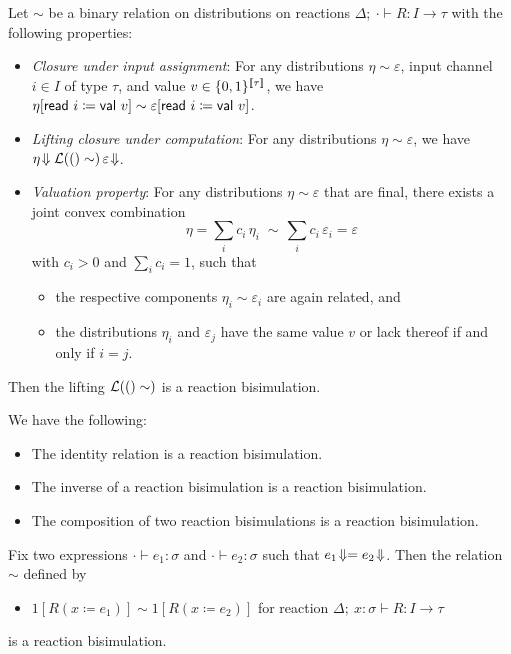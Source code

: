 \begin{lemma}\label{lem:reaction_seed}
Let $\sim$ be a binary relation on distributions on reactions $\Delta; \ \cdot \vdash R : I \to \tau$ with the following properties:
\begin{itemize}
\item \emph{Closure under input assignment}: For any distributions $\eta \sim \varepsilon$, input channel $i \in I$ of type $\tau$, and value $v \in \{0,1\}^{\llbracket \tau \rrbracket}$, we have $\eta[\mathsf{read} \ i \coloneqq \mathsf{val} \ v] \sim \varepsilon[\mathsf{read} \ i \coloneqq \mathsf{val} \ v]$.

\item \emph{Lifting closure under computation}: For any distributions $\eta \sim \varepsilon$, we have $\eta \! \Downarrow \mathcal{L}(()\sim) \, \varepsilon \! \Downarrow$.

\item \emph{Valuation property}: For any distributions $\eta \sim \varepsilon$ that are final, there exists a joint convex combination \[\eta = \sum_i c_i \, \eta_i \; \sim \, \sum_i c_i \, \varepsilon_i = \varepsilon\]
with $c_i > 0$ and $\sum_i c_i = 1$, such that
\begin{itemize}
\item the respective components $\eta_i \sim \varepsilon_i$ are again related, and
\item the distributions $\eta_i$ and $\varepsilon_j$ have the same value $v$ or lack thereof if and only if $i = j$.
\end{itemize}
\end{itemize}
Then the lifting $\mathcal{L}(()\sim)$ is a reaction bisimulation.
\end{lemma}

\begin{lemma}
We have the following: 
\begin{itemize}
\item The identity relation is a reaction bisimulation.
\item The inverse of a reaction bisimulation is a reaction bisimulation.
\item The composition of two reaction bisimulations is a reaction bisimulation.
\end{itemize}
\end{lemma}

\begin{example}
Fix two expressions $\cdot \vdash e_1 : \sigma$ and $\cdot \vdash e_2 : \sigma$ such that $e_1 \! \Downarrow = e_2 \! \Downarrow$. Then the relation $\sim$ defined by
\begin{itemize}
\item $1[R(x \coloneqq e_1)] \sim 1[R(x \coloneqq e_2)]$ for reaction $\Delta; \ x : \sigma \vdash R : I \to \tau$
\end{itemize}
is a reaction bisimulation.
\end{example}


